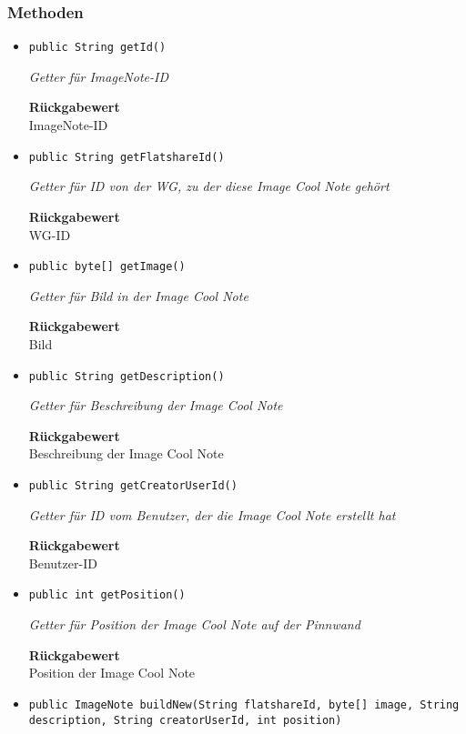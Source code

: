     \subsubsection{Methoden}
    \begin{itemize}
    	\item{\texttt{public String getId()}}
    	
    	\textit{Getter für ImageNote-ID}
    	
    	
    	
    	\textbf{Rückgabewert} \\
    	ImageNote-ID        \item{\texttt{public String getFlatshareId()}}
    	
    	\textit{Getter für ID von der WG, zu der diese Image Cool Note gehört}
    	
    	
    	
    	\textbf{Rückgabewert} \\
    	WG-ID        \item{\texttt{public byte[] getImage()}}
    	
    	\textit{Getter für Bild in der Image Cool Note}
    	
    	
    	
    	\textbf{Rückgabewert} \\
    	Bild        \item{\texttt{public String getDescription()}}
    	
    	\textit{Getter für Beschreibung der Image Cool Note}
    	
    	
    	
    	\textbf{Rückgabewert} \\
    	Beschreibung der Image Cool Note        \item{\texttt{public String getCreatorUserId()}}
    	
    	\textit{Getter für ID vom Benutzer, der die Image Cool Note erstellt hat}
    	
    	
    	
    	\textbf{Rückgabewert} \\
    	Benutzer-ID        \item{\texttt{public int getPosition()}}
    	
    	\textit{Getter für Position der Image Cool Note auf der Pinnwand}
    	
    	
    	
    	\textbf{Rückgabewert} \\
    	Position der Image Cool Note        \item{\texttt{public ImageNote buildNew(String flatshareId, byte[] image, String description, String creatorUserId, int position)}}
    	

\end{itemize}
